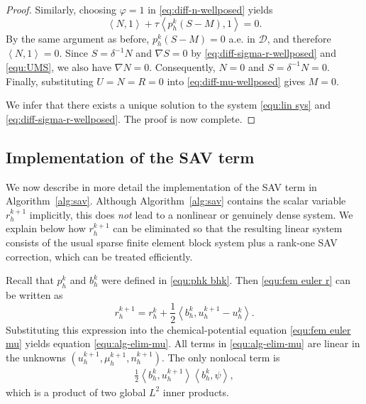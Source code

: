 \documentclass[11pt, reqno]{amsart}
\theoremstyle{definition}
\numberwithin{equation}{section}
\newcommand{\inpro}[2]{\left\langle#1,#2\right\rangle}
\begin{document}
{\begin{proof}
		Similarly, choosing $\varphi=1$ in \eqref{eq:diff-n-wellposed} yields
		\[
		\inpro{N}{1}
		+
		\tau\inpro{p_h^k(S-M)}{1}
		=0.
		\]
		By the same argument as before, $p_h^k(S-M)=0$ a.e. in $\mathscr{D}$, and therefore $\inpro{N}{1}=0$.
		Since $S=\delta^{-1}N$ and $\nabla S=0$ by \eqref{eq:diff-sigma-r-wellposed} and \eqref{equ:UMS}, we also have $\nabla N=0$. Consequently, $N=0$ and $S=\delta^{-1}N=0$. 
		Finally, substituting $U=N=R=0$ into \eqref{eq:diff-mu-wellposed} gives $M=0$.
		
		We infer that there exists a unique solution to the system \eqref{equ:lin sys} and \eqref{eq:diff-sigma-r-wellposed}. The proof is now complete.
	\end{proof}




\subsection{Implementation of the SAV term}

We now describe in more detail the implementation of the SAV term in Algorithm~\ref{alg:sav}.
Although Algorithm~\ref{alg:sav} contains the scalar variable $r_h^{k+1}$ implicitly, this does \emph{not} lead to a nonlinear or genuinely dense system. We explain below how $r_h^{k+1}$ can be eliminated so that the resulting linear system consists of the usual sparse finite element block system plus a rank-one SAV correction, which can be treated efficiently.

Recall that $p_h^k$ and $b_h^k$ were defined in \eqref{equ:phk bhk}.
Then \eqref{equ:fem euler r} can be written as
\[
r_h^{k+1}
=
r_h^k
+
\frac12\inpro{b_h^k}{u_h^{k+1}-u_h^k}.
\]
Substituting this expression into the chemical-potential equation
\eqref{equ:fem euler mu} yields equation \eqref{equ:alg-elim-mu}.
All terms in \eqref{equ:alg-elim-mu} are linear in the unknowns
$(u_h^{k+1},\mu_h^{k+1},n_h^{k+1})$. The only nonlocal term is
\begin{align}\label{equ:nonloc}
\frac12
\inpro{b_h^k}{u_h^{k+1}}
\inpro{b_h^k}{\psi},
\end{align}
which is a product of two global $L^2$ inner products.

}
\end{document}
